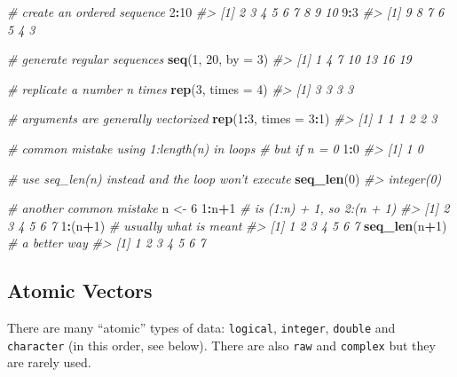 \documentclass[]{book}
\newenvironment{Shaded}{\begin{snugshade}}{\end{snugshade}}
\newcommand{\CommentTok}[1]{\textcolor[rgb]{0.56,0.35,0.01}{\textit{#1}}}
\newcommand{\DataTypeTok}[1]{\textcolor[rgb]{0.13,0.29,0.53}{#1}}
\newcommand{\DecValTok}[1]{\textcolor[rgb]{0.00,0.00,0.81}{#1}}
\newcommand{\KeywordTok}[1]{\textcolor[rgb]{0.13,0.29,0.53}{\textbf{#1}}}
\newcommand{\NormalTok}[1]{#1}
\newcommand{\OperatorTok}[1]{\textcolor[rgb]{0.81,0.36,0.00}{\textbf{#1}}}
\newcommand{\StringTok}[1]{\textcolor[rgb]{0.31,0.60,0.02}{#1}}
\theoremstyle{definition}
\theoremstyle{definition}
\theoremstyle{definition}
\theoremstyle{remark}
\begin{document}
\begin{Shaded}
\begin{Highlighting}[]
\CommentTok{# create an ordered sequence}
\DecValTok{2}\OperatorTok{:}\DecValTok{10}
\CommentTok{#> [1]  2  3  4  5  6  7  8  9 10}
\DecValTok{9}\OperatorTok{:}\DecValTok{3}
\CommentTok{#> [1] 9 8 7 6 5 4 3}

\CommentTok{# generate regular sequences}
\KeywordTok{seq}\NormalTok{(}\DecValTok{1}\NormalTok{, }\DecValTok{20}\NormalTok{, }\DataTypeTok{by =} \DecValTok{3}\NormalTok{)}
\CommentTok{#> [1]  1  4  7 10 13 16 19}

\CommentTok{# replicate a number n times}
\KeywordTok{rep}\NormalTok{(}\DecValTok{3}\NormalTok{, }\DataTypeTok{times =} \DecValTok{4}\NormalTok{)}
\CommentTok{#> [1] 3 3 3 3}

\CommentTok{# arguments are generally vectorized}
\KeywordTok{rep}\NormalTok{(}\DecValTok{1}\OperatorTok{:}\DecValTok{3}\NormalTok{, }\DataTypeTok{times =} \DecValTok{3}\OperatorTok{:}\DecValTok{1}\NormalTok{)}
\CommentTok{#> [1] 1 1 1 2 2 3}

\CommentTok{# common mistake using 1:length(n) in loops}
\CommentTok{# but if n = 0}
\DecValTok{1}\OperatorTok{:}\DecValTok{0}
\CommentTok{#> [1] 1 0}

\CommentTok{# use seq_len(n) instead and the loop won't execute}
\KeywordTok{seq_len}\NormalTok{(}\DecValTok{0}\NormalTok{)}
\CommentTok{#> integer(0)}

\CommentTok{# another common mistake}
\NormalTok{n <-}\StringTok{ }\DecValTok{6}
\DecValTok{1}\OperatorTok{:}\NormalTok{n}\OperatorTok{+}\DecValTok{1}        \CommentTok{# is (1:n) + 1, so 2:(n + 1)}
\CommentTok{#> [1] 2 3 4 5 6 7}
\DecValTok{1}\OperatorTok{:}\NormalTok{(n}\OperatorTok{+}\DecValTok{1}\NormalTok{)      }\CommentTok{# usually what is meant}
\CommentTok{#> [1] 1 2 3 4 5 6 7}
\KeywordTok{seq_len}\NormalTok{(n}\OperatorTok{+}\DecValTok{1}\NormalTok{) }\CommentTok{# a better way}
\CommentTok{#> [1] 1 2 3 4 5 6 7}
\end{Highlighting}
\end{Shaded}

\hypertarget{atomic-vectors}{%
\subsection{Atomic Vectors}\label{atomic-vectors}}

There are many ``atomic'' types of data: \texttt{logical},
\texttt{integer}, \texttt{double} and \texttt{character} (in this order,
see below). There are also \texttt{raw} and \texttt{complex} but they
are rarely used.
\end{document}
